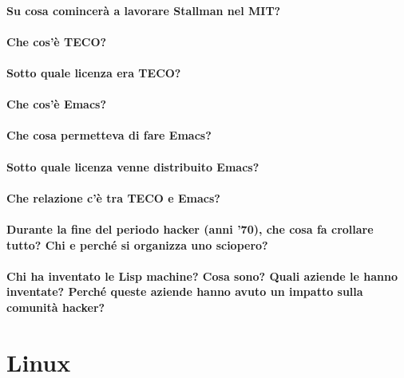 \documentclass[a4paper]{article}
\begin{document}
	\paragraph{Su cosa comincerà a lavorare Stallman nel MIT?}
	
	
	\paragraph{Che cos'è TECO?}
	
	\paragraph{Sotto quale licenza era TECO?}
	
	\paragraph{Che cos'è Emacs?} %
	
	\paragraph{Che cosa permetteva di fare Emacs?}
	
	\paragraph{Sotto quale licenza venne distribuito Emacs?}
	
	\paragraph{Che relazione c'è tra TECO e Emacs?}
	
	
	\paragraph{Durante la fine del periodo hacker (anni '70), che cosa fa crollare tutto? Chi e perché si organizza uno sciopero?}
	
	
	\paragraph{Chi ha inventato le Lisp machine? Cosa sono? Quali aziende le hanno inventate? Perché queste aziende hanno avuto un impatto sulla comunità hacker?}
	
	
	
	\section{Linux}
	
\end{document}
